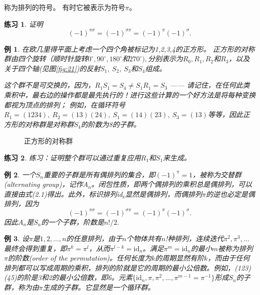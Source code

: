\documentclass[hyperref,UTF8]{ctexbook}
\newtheorem{eg}{例}[chapter]
\newtheorem*{exercise}{练习}
\begin{document}
称为排列的符号。 有时它被表示为符号$\pi$。
 \begin{exercise}证明
$$
(-1)^{\pi\sigma}=(-1)^{\sigma\pi}=(-1)^{\pi}(-1)^{\sigma}.
$$
\end{exercise}
\begin{eg}
在欧几里得平面上考虑一个四个角被标记为1,2,3,4的正方形。 正方形的对称群由四个旋转（顺时针旋转$0^{\circ }, 90^{\circ }, 180^{\circ }$和$270^{\circ }) , $分别表示为$R_0,R_1,R_2$和$R_3$，以及关于四个轴(见图\ref{fig:21})的反射$S_{1},\:S_{2},\:S_{3}$和$S_{4}$组成。

这个群不是可交换的，因为，$R_1S_1=S_4\neq S_1R_1=S_3$ —— 请记住，在任何此类乘积中，最右边的操作都是最先执行的！进行这些计算的一个好方法是将每种变换都视为顶点的排列； 例如，在循环符号$R_1=(1234),\:R_2=(13)(24),\:S_1=(14)(23),\:S_3=(13)$等等，因此正方形的对称群是对称群$S_{4}$的阶数为8的子群。
\end{eg}
\begin{figure}
    \centering
      \caption{正方形的对称群}
\end{figure}\label{fig:21}

\begin{exercise}
练习：证明整个群可以通过重复应用$R_{1}$和$S_{1}$来生成。
\end{exercise}
\begin{eg}
    一个$S_n$重要的子群是所有偶排列的集合，即$(-1)^{\pi}=1$，被称为交替群(alternating group)，记作$A_n$。闭包性质，即两个偶排列的乘积总是偶排列，可以直接由式(2.1)得出。此外，标识排列id$_\mathrm{z}$显然是偶排列，而偶排列$\pi$的逆也必定是偶排列，因为
    \begin{equation}(-1)^{\pi\sigma}=(-1)^{\sigma\pi}=(-1)^{\pi}(-1)^{\sigma}.
    \end{equation}
   因此$A_n$是$S_n$的一个子群，阶数是$n!/2.$ 
\end{eg}
  
\begin{eg}
    设$\pi$是$1,2,\ldots,n$的任意排列，由于$n$个物体共有$n$!种排列，连续迭代$\pi^2,\pi^3,\ldots$最终会得到重复，即$\pi^k=\pi^l$，从而$\pi^{l-k}=\mathrm{id}_n$。满足$\pi^m=\mathrm{id}_n$的最小$m$被称为排列$\pi$的阶数(order of the permutation)。任何长度为$k$的周期显然有阶$k$，而由于任何排列都可以写成周期的乘积，排列的阶就是它的周期的最小公倍数。例如，(123)(45)的阶是3和2的最小公倍数，即6。元素$\{\mathrm{id}_n,\pi,\pi^2,\ldots,\pi^{m-1}=\pi^{-1}\}$形成$S_n$的子群，称为由$\pi$生成的子群。它显然是一个循环群。
\end{eg}
 
\end{document}
